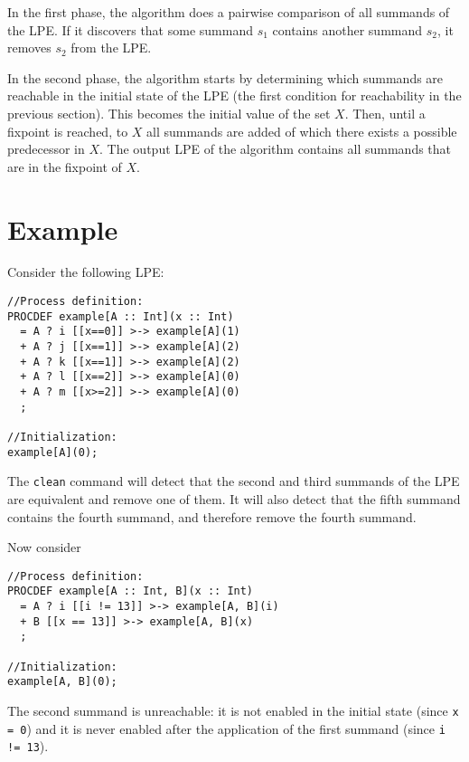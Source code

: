 In the first phase, the algorithm does a pairwise comparison of all summands of the LPE.
If it discovers that some summand $s_1$ contains another summand $s_2$, it removes $s_2$ from the LPE.

In the second phase, the algorithm starts by determining which summands are reachable in the initial state of the LPE (the first condition for reachability in the previous section).
This becomes the initial value of the set $X$.
Then, until a fixpoint is reached, to $X$ all summands are added of which there exists a possible predecessor in $X$.
The output LPE of the algorithm contains all summands that are in the fixpoint of $X$.

\section{Example}

Consider the following LPE:

\begin{lstlisting}
//Process definition:
PROCDEF example[A :: Int](x :: Int)
  = A ? i [[x==0]] >-> example[A](1)
  + A ? j [[x==1]] >-> example[A](2)
  + A ? k [[x==1]] >-> example[A](2)
  + A ? l [[x==2]] >-> example[A](0)
  + A ? m [[x>=2]] >-> example[A](0)
  ;

//Initialization:
example[A](0);
\end{lstlisting}

The \texttt{clean} command will detect that the second and third summands of the LPE are equivalent and remove one of them.
It will also detect that the fifth summand contains the fourth summand, and therefore remove the fourth summand.

Now consider

\begin{lstlisting}
//Process definition:
PROCDEF example[A :: Int, B](x :: Int)
  = A ? i [[i != 13]] >-> example[A, B](i)
  + B [[x == 13]] >-> example[A, B](x)
  ;

//Initialization:
example[A, B](0);
\end{lstlisting}

The second summand is unreachable: it is not enabled in the initial state (since \texttt{x = 0}) and it is never enabled after the application of the first summand (since \texttt{i != 13}).

